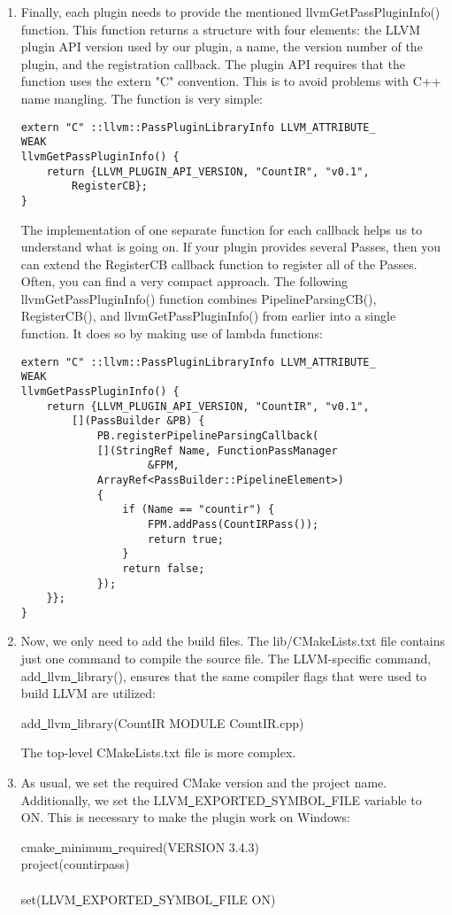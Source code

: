 \begin{enumerate}
\item Finally, each plugin needs to provide the mentioned llvmGetPassPluginInfo() function. This function returns a structure with four elements: the LLVM plugin API version used by our plugin, a name, the version number of the plugin, and the registration callback. The plugin API requires that the function uses the extern "C" convention. This is to avoid problems with C++ name mangling. The function is very simple:
\begin{lstlisting}[caption={}]
extern "C" ::llvm::PassPluginLibraryInfo LLVM_ATTRIBUTE_
WEAK
llvmGetPassPluginInfo() {
	return {LLVM_PLUGIN_API_VERSION, "CountIR", "v0.1",
		RegisterCB};
}
\end{lstlisting}
The implementation of one separate function for each callback helps us to understand what is going on. If your plugin provides several Passes, then you can extend the RegisterCB callback function to register all of the Passes. Often, you can find a very compact approach. The following llvmGetPassPluginInfo() function combines PipelineParsingCB(), RegisterCB(), and llvmGetPassPluginInfo() from earlier into a single function. It does so by making use of lambda functions:
\begin{lstlisting}[caption={}]
extern "C" ::llvm::PassPluginLibraryInfo LLVM_ATTRIBUTE_
WEAK
llvmGetPassPluginInfo() {
	return {LLVM_PLUGIN_API_VERSION, "CountIR", "v0.1",
		[](PassBuilder &PB) {
			PB.registerPipelineParsingCallback(
			[](StringRef Name, FunctionPassManager 
					&FPM,
			ArrayRef<PassBuilder::PipelineElement>) 
			{
				if (Name == "countir") {
					FPM.addPass(CountIRPass());
					return true;
				}
				return false;
			});
	}};
}
\end{lstlisting}

\item Now, we only need to add the build files. The lib/CMakeLists.txt file contains just one command to compile the source file. The LLVM-specific command, add\underline{~}llvm\underline{~}library(), ensures that the same compiler flags that were used to build LLVM are utilized:
\begin{tcolorbox}[colback=white,colframe=black]
add\underline{~}llvm\underline{~}library(CountIR MODULE CountIR.cpp)
\end{tcolorbox}
The top-level CMakeLists.txt file is more complex.

\item As usual, we set the required CMake version and the project name. Additionally, we set the LLVM\underline{~}EXPORTED\underline{~}SYMBOL\underline{~}FILE variable to ON. This is necessary to make the plugin work on Windows:
\begin{tcolorbox}[colback=white,colframe=black]
cmake\underline{~}minimum\underline{~}required(VERSION 3.4.3) \\
project(countirpass)\\
\\
set(LLVM\underline{~}EXPORTED\underline{~}SYMBOL\underline{~}FILE ON)
\end{tcolorbox}


\end{enumerate}

